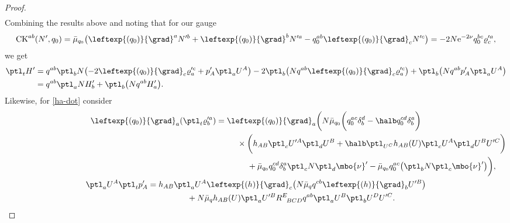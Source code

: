 \begin{proof}
\begin{gather*}
\end{gather*}
Combining the results above and noting that for our gauge
\begin{align*}
{\rm CK}^{ab} (N', q_0) = \bar{\mu}_{q_0} \bigl(\leftexp{(q_0)}{\grad}^a N'^b + \leftexp{(q_0)}{\grad}^b N'^a - q^{ab}_0 \leftexp{(q_0)}{\grad}_c N'^c\bigr) = - 2 N {\rm e}^{-2 \nu} q^{bc}_0 \varrho'^a_c,
\end{align*}
we get
\begin{align*}
\ptl_t H' &{}= q^{ab} \ptl_b N \bigl(-2 \leftexp{(q_0)}{\grad}_c \varrho'^c_a + p'_A \ptl_a U^A\bigr) -2 \ptl_b \bigl(N q^{ab} \leftexp{(q_0)}{\grad}_c \varrho'^c_a\bigr) + \ptl_b \bigl(N q^{ab} p'_A \ptl_a U^A\bigr) \\
&{}= q^{ab} \ptl_a N H'_b + \ptl_b \bigl(N q^{ab} H'_a\bigr).
\end{align*}
Likewise, for \eqref{ha-dot} consider
\begin{gather*}
 \leftexp{(q_0)}{\grad}_a (\ptl_t \varrho'^a_b) = \leftexp{(q_0)}{\grad}_a \biggl(N \bar{\mu}_{q_0} \biggl(q^{ac}_0 \delta^d_b - \halb q_0^{cd} \delta^a_b\biggr)\notag\\ \hphantom{\leftexp{(q_0)}{\grad}_a (\ptl_t \varrho'^a_b) =\leftexp{(q_0)}{\grad}_a \biggl(}{}
 \times\biggl(h_{AB} \ptl_c U'^A \ptl_d U^B+ \halb \ptl_{U^C} h_{AB} (U) \ptl_c U^A \ptl_d U^B U'^C\biggr) \notag\\
 \hphantom{\leftexp{(q_0)}{\grad}_a (\ptl_t \varrho'^a_b) =\leftexp{(q_0)}{\grad}_a \biggl(}{}
 +\bar{\mu}_{q_0} q_0^{cd} \delta^a_b \ptl_c N \ptl_d \mbo{\nu}' - \bar{\mu}_{q_0} q^{ac}_0 \bigl(\ptl_b N \ptl_c \mbo{\nu}'\bigr) \biggr), \\
\ptl_a U^A \ptl_t p'_A = h_{AB} \ptl_a U^A \leftexp{(h)}{\grad}_c \bigl(N \bar{\mu}_q q^{cb} \leftexp{(h)}{\grad}_b U'^B\bigr) \notag\\ \hphantom{\ptl_a U^A \ptl_t p'_A =}{}
+ N \bar{\mu}_q h_{AB} (U) \ptl_a U'^B R^{E}_{\,\,\,\,BCD} q^{ab} \ptl_a U^B \ptl_b U^D U'^C.
\end{gather*}


\end{proof}
